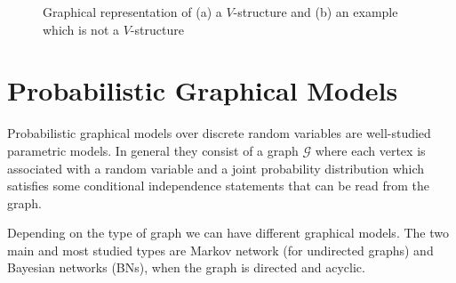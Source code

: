 \documentclass[11pt,a4paper, twoside]{book}
\begin{document}
\begin{figure}
\begin{subfigure}{0.5\textwidth}
\caption{}
\label{fig:Vstr}
\end{subfigure}
\begin{subfigure}{0.5\textwidth}
\caption{}
\label{fig:N-Vstr}
\end{subfigure}
\caption{{Graphical representation of (a) a $V$-structure and (b) an example which is not a $V$-structure}}
\end{figure}


\section{Probabilistic Graphical Models}
\label{sec:graphmodel}

Probabilistic graphical models over discrete random variables are well-studied parametric models. In general they consist of a graph $\mathcal{G}$ where each vertex is associated with a random variable and a joint probability distribution which satisfies some conditional independence statements that can be read from the graph. 

Depending on the type of graph we can have different graphical models. The two main and most studied types are Markov network (for undirected graphs) and Bayesian networks (BNs), when the graph is directed and acyclic. 
\end{document}
